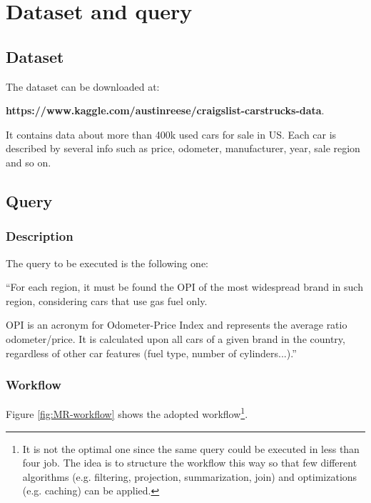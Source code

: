 \chapter{Dataset and query}

\section{Dataset}

The dataset can be downloaded at: 

\bigskip

\begin{center}
  \textbf{https://www.kaggle.com/austinreese/craigslist-carstrucks-data}.
\end{center}

\bigskip

It contains data about more than 400k used cars for sale in US.
Each car is described by several info such as price, odometer, manufacturer, year, sale region and so on.

\section{Query}

\subsection{Description}

The query to be executed is the following one:

\bigskip

``For each region, it must be found the OPI of the most widespread brand in such region, considering cars that use gas fuel only. 

OPI is an acronym for Odometer-Price Index and represents the average ratio odometer/price. It is calculated upon all cars of a given brand in the country, regardless of other car features (fuel type, number of cylinders...).''

\newpage
\subsection{Workflow}\label{workflow}

Figure \ref{fig:MR-workflow} shows the adopted workflow\footnote{It is not the optimal one since the same query could be executed in less than four job. The idea is to structure the workflow this way so that few different algorithms (e.g. filtering, projection, summarization, join) and optimizations (e.g. caching) can be applied. }.

